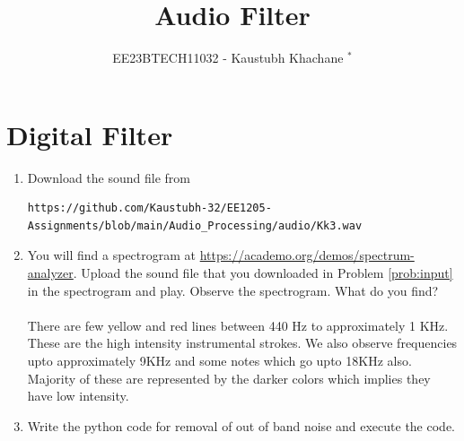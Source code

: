 \documentclass[journal,12pt,twocolumn]{IEEEtran}
\newtheorem{problem}{Problem}
\theoremstyle{remark}
\begin{document}

\vspace{3cm}
\title{Audio Filter}
\author{EE23BTECH11032 - Kaustubh Khachane $^{*}$%
}
\maketitle
\newpage
\bigskip
\renewcommand{\thefigure}{\arabic{figure}}
\renewcommand{\thetable}{\theenumi}


\section{Digital Filter}
\begin{enumerate}[label=\thesection.\arabic*
,ref=\thesection.\theenumi]
\item
\label{prob:input}
Download the sound file from  
\begin{lstlisting}
https://github.com/Kaustubh-32/EE1205-Assignments/blob/main/Audio_Processing/audio/Kk3.wav
\end{lstlisting}
\item
\label{prob:spectrogram}
You will find a spectrogram at \href{https://academo.org/demos/spectrum-analyzer}{\url{https://academo.org/demos/spectrum-analyzer}}. 
%
Upload the sound file that you downloaded in Problem \ref{prob:input} in the spectrogram  and play.  Observe the spectrogram. What do you find?
\\
%
\solution\\ There are few  yellow and red lines between 440 Hz to approximately 1 KHz. These are the high intensity instrumental strokes. We also observe frequencies upto approximately 9KHz and some notes which go upto 18KHz also. Majority of these are represented by the darker colors which implies they have low intensity.  
\item
\label{prob:output}
Write the python code for removal of out of band noise and execute the code.
\\
\solution


\end{enumerate}
\end{document}
